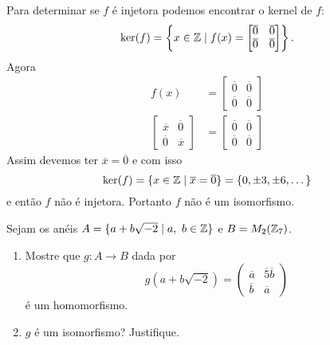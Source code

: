 \documentclass[12pt]{exam}
\begin{document}
\begin{enumerate}[label=({\alph*})]
        Para determinar se $f$ é injetora podemos encontrar o kernel de $f$:
        \[
            \ker(f) = \left\{x \in \mathbb{Z} \mid f(x) = \begin{bmatrix}
                \overline{0} & \overline{0}\\\overline{0} & \overline{0}
            \end{bmatrix}\right\}.
        \]
        Agora
        \begin{align*}
            f(x) &= \begin{bmatrix}
                \overline{0} & \overline{0}\\\overline{0} & \overline{0}
            \end{bmatrix}\\
            \begin{bmatrix}
                \overline{x} & \overline{0}\\\overline{0} & \overline{x}
            \end{bmatrix} &= \begin{bmatrix}
            \overline{0} & \overline{0}\\\overline{0} & \overline{0}
            \end{bmatrix}
        \end{align*}
        Assim devemos ter $\overline{x} = \overline{0}$ e com isso
        \[
            \ker(f) = \{x \in \mathbb{Z} \mid \overline{x} = \overline{0}\} = \{0, \pm 3, \pm 6, \dots\}
        \]
        e então $f$ não é injetora. Portanto $f$ não é um isomorfismo.
    \end{enumerate}
    \vspace{.4cm}

    \questao Sejam os anéis $A = \{ a + b\sqrt{-2} \mid a,\ b \in \mathbb{Z}\}$ e $B = M_2(\mathbb{Z}_7)$.
    \begin{enumerate}[label=({\alph*})]
        \item Mostre que $g : A \to B$ dada por
        \[
            g(a + b\sqrt{-2}) =
            \begin{pmatrix}
                \overline{a} & \overline{5}\overline{b}\\
                \overline{b} & \overline{a}
            \end{pmatrix}
        \]
        é um homomorfismo.

        \item $g$ é um isomorfismo? Justifique.
    \end{enumerate}
\end{document}
